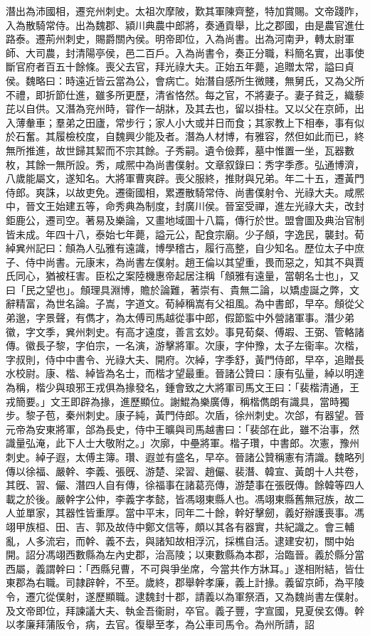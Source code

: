 \begin{pinyinscope}
潛出為沛國相，遷兖州刺史。太祖次摩陂，歎其軍陳齊整，特加賞賜。文帝踐阼，入為散騎常侍。出為魏郡、潁川典農中郎將，奏通貢舉，比之郡國，由是農官進仕路泰。遷荊州刺史，賜爵關內侯。明帝即位，入為尚書。出為河南尹，轉太尉軍師、大司農，封清陽亭侯，邑二百戶。入為尚書令，奏正分職，料簡名實，出事使斷官府者百五十餘條。喪父去官，拜光祿大夫。正始五年薨，追贈太常，謚曰貞侯。魏略曰：時遠近皆云當為公，會病亡。始潛自感所生微賤，無舅氏，又為父所不禮，即折節仕進，雖多所更歷，清省恪然。每之官，不將妻子。妻子貧乏，織藜芘以自供。又潛為兖州時，甞作一胡牀，及其去也，留以掛柱。又以父在京師，出入薄軬車；羣弟之田廬，常步行；家人小大或并日而食；其家教上下相奉，事有似於石奮。其履檢校度，自魏興少能及者。潛為人材博，有雅容，然但如此而已，終無所推進，故世歸其絜而不宗其餘。子秀嗣。遺令儉葬，墓中惟置一坐，瓦器數枚，其餘一無所設。秀，咸熈中為尚書僕射。文章叙錄曰：秀字季彥。弘通博濟，八歲能屬文，遂知名。大將軍曹爽辟。喪父服終，推財與兄弟。年二十五，遷黃門侍郎。爽誅，以故吏免。遷衞國相，累遷散騎常侍、尚書僕射令、光祿大夫。咸熈中，晉文王始建五等，命秀典為制度，封廣川侯。晉室受禪，進左光祿大夫，改封鉅鹿公，遷司空。著易及樂論，又畫地域圖十八篇，傳行於世。盟會圖及典治官制皆未成。年四十八，泰始七年薨，謚元公，配食宗廟。少子頠，字逸民，襲封。荀綽兾州記曰：頠為人弘雅有遠識，博學稽古，履行高整，自少知名。歷位太子中庶子、侍中尚書。元康末，為尚書左僕射。趙王倫以其望重，畏而惡之，知其不與賈氏同心，猶被枉害。臣松之案陸機惠帝起居注稱「頠雅有遠量，當朝名士也」，又曰「民之望也」。頠理具淵博，贍於論難，著崇有、貴無二論，以矯虛誕之弊，文辭精富，為世名論。子嵩，字道文。荀綽稱嵩有父祖風。為中書郎，早卒。頠從父弟邈，字景聲，有儁才，為太傅司馬越從事中郎，假節監中外營諸軍事。潛少弟徽，字文季，兾州刺史。有高才遠度，善言玄妙。事見荀粲、傅嘏、王弼、管輅諸傳。徽長子黎，字伯宗，一名演，游擊將軍。次康，字仲豫，太子左衞率。次楷，字叔則，侍中中書令、光祿大夫、開府。次綽，字季舒，黃門侍郎，早卒，追贈長水校尉。康、楷、綽皆為名士，而楷才望最重。晉諸公贊曰：康有弘量，綽以明達為稱，楷少與琅邪王戎俱為掾發名，鍾會致之大將軍司馬文王曰：「裴楷清通，王戎簡要。」文王即辟為掾，進歷顯位。謝鯤為樂廣傳，稱楷儁朗有識具，當時獨步。黎子苞，秦州刺史。康子純，黃門侍郎。次盾，徐州刺史。次郃，有器望。晉元帝為安東將軍，郃為長史，侍中王曠與司馬越書曰：「裴郃在此，雖不治事，然識量弘淹，此下人士大敬附之。」次廓，中壘將軍。楷子瓚，中書郎。次憲，豫州刺史。綽子遐，太傅主簿。瓚、遐並有盛名，早卒。晉諸公贊稱憲有清識。魏略列傳以徐福、嚴幹、李義、張旣、游楚、梁習、趙儼、裴潛、韓宣、黃朗十人共卷，其旣、習、儼、潛四人自有傳，徐福事在諸葛亮傳，游楚事在張旣傳。餘韓等四人載之於後。嚴幹字公仲，李義字孝懿，皆馮翊東縣人也。馮翊東縣舊無冠族，故二人並單家，其器性皆重厚。當中平末，同年二十餘，幹好擊劒，義好辦護喪事。馮翊甲族桓、田、吉、郭及故侍中鄭文信等，頗以其各有器實，共紀識之。會三輔亂，人多流宕，而幹、義不去，與諸知故相浮沉，採樵自活。逮建安初，關中始開。詔分馮翊西數縣為左內史郡，治高陵；以東數縣為本郡，治臨晉。義於縣分當西屬，義謂幹曰：「西縣兒曹，不可與爭坐席，今當共作方牀耳。」遂相附結，皆仕東郡為右職。司隷辟幹，不至。歲終，郡舉幹孝廉，義上計掾。義留京師，為平陵令，遷宂從僕射，遂歷顯職。逮魏封十郡，請義以為軍祭酒，又為魏尚書左僕射。及文帝即位，拜諫議大夫、執金吾衞尉，卒官。義子豐，字宣國，見夏侯玄傳。幹以孝廉拜蒲阪令，病，去官。復舉至孝，為公車司馬令。為州所請，詔
\end{pinyinscope}
